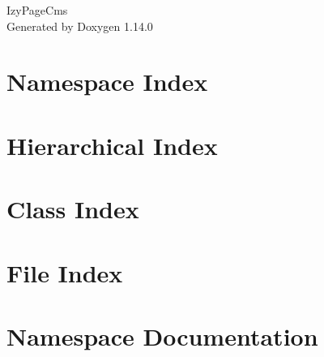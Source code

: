 \documentclass[twoside]{book}
\newcommand{\+}{\discretionary{\mbox{\scriptsize$\hookleftarrow$}}{}{}}
\newcommand{\clearemptydoublepage}{%
    \newpage{\pagestyle{empty}\cleardoublepage}%
  }
\begin{document}
  \raggedbottom
    \hypersetup{pageanchor=false,
                bookmarksnumbered=true,
                pdfencoding=unicode
               }
  \begin{titlepage}
  \vspace*{7cm}
  \begin{center}%
  {\Large Izy\+Page\+Cms}\\
  \vspace*{1cm}
  {\large Generated by Doxygen 1.14.0}\\
  \end{center}
  \end{titlepage}
  \clearemptydoublepage
  \tableofcontents
  \clearemptydoublepage
  \hypersetup{pageanchor=true}

\chapter{Namespace Index}

\chapter{Hierarchical Index}

\chapter{Class Index}

\chapter{File Index}

\chapter{Namespace Documentation}

















\end{document}
